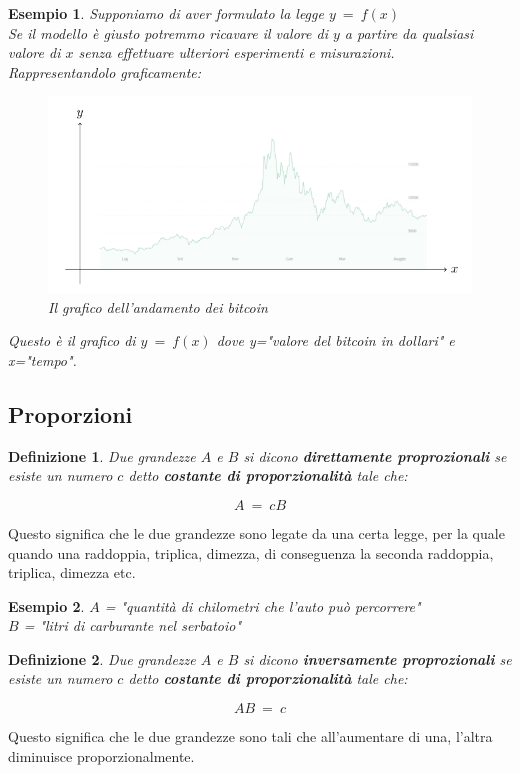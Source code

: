 \documentclass[12pt, a4paper]{article}
\theoremstyle{break}
\newtheorem{defn}{Definizione}
\theoremstyle{lemma}
\theoremstyle{lemma}
\theoremstyle{lemma}
\newtheorem{esem}{Esempio}
\begin{document}
\begin{esem}
Supponiamo di aver formulato la legge $ y\ =\ f(x)\ $\\
Se il modello è giusto potremmo ricavare il valore di $y$ a partire da qualsiasi valore di $x$ senza effettuare ulteriori esperimenti e misurazioni.\\
Rappresentandolo graficamente:

\begin{figure}[ht]
  \center
  \includegraphics[scale=0.75]{graficobitcoin}
  \caption{Il grafico dell'andamento dei bitcoin}
  \label{fig:btc_chart}
\end{figure}
Questo è il grafico di $y\ =\ f(x)$ dove y="valore del bitcoin in dollari" e x="tempo".
\end{esem}

\subsection{Proporzioni}
\begin{defn}
  Due grandezze $A$ e $B$ si dicono \textbf{direttamente proprozionali} se esiste un numero $c$ detto \textbf{costante di proporzionalità} tale che:

\begin{equation}
  A\ =\ cB
\end{equation}
\end{defn}

Questo significa che le due grandezze sono legate da una certa legge, per la quale quando una raddoppia, triplica, dimezza, di conseguenza la seconda raddoppia, triplica, dimezza etc.

\begin{esem}
  $A$ = "quantità di chilometri che l'auto può percorrere"\\
  $B$ = "litri di carburante nel serbatoio"
\end{esem}

\begin{defn}
  Due grandezze $A$ e $B$ si dicono \textbf{inversamente proprozionali} se esiste un numero $c$ detto \textbf{costante di proporzionalità} tale che:

\begin{equation}
  AB\ =\ c
\end{equation}
\end{defn}
Questo significa che le due grandezze sono tali che all'aumentare di una, l'altra diminuisce proporzionalmente.
\end{document}
